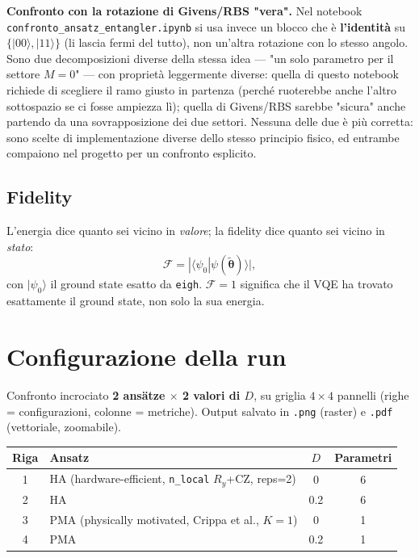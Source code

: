 \documentclass[11pt,a4paper]{article}
\begin{document}
\textbf{Confronto con la rotazione di Givens/RBS "vera".} Nel notebook
\texttt{confronto\_ansatz\_entangler.ipynb} si usa invece un blocco che
è \textbf{l'identità} su $\{|00\rangle,|11\rangle\}$ (li lascia fermi
del tutto), non un'altra rotazione con lo stesso angolo. Sono due
decomposizioni diverse della stessa idea --- "un solo parametro per il
settore $M=0$" --- con proprietà leggermente diverse: quella di questo
notebook richiede di scegliere il ramo giusto in partenza (perché
ruoterebbe anche l'altro sottospazio se ci fosse ampiezza lì); quella di
Givens/RBS sarebbe "sicura" anche partendo da una sovrapposizione dei
due settori. Nessuna delle due è più corretta: sono scelte di
implementazione diverse dello stesso principio fisico, ed entrambe
compaiono nel progetto per un confronto esplicito.

\subsection*{Fidelity}

L'energia dice quanto sei vicino in \emph{valore}; la fidelity dice
quanto sei vicino in \emph{stato}:
$$\mathcal F = |\langle\psi_0|\psi(\tilde{\boldsymbol\theta})\rangle|,$$
con $|\psi_0\rangle$ il ground state esatto da \texttt{eigh}.
$\mathcal F=1$ significa che il VQE ha trovato esattamente il ground
state, non solo la sua energia.

\section*{Configurazione della run}

Confronto incrociato \textbf{2 ansätze $\times$ 2 valori di $D$}, su
griglia $4\times4$ pannelli (righe = configurazioni, colonne =
metriche). Output salvato in \texttt{.png} (raster) e \texttt{.pdf}
(vettoriale, zoomabile).

\begin{center}
\renewcommand{\arraystretch}{1.25}
\begin{tabular}{@{}cp{5.3cm}cc@{}}
\toprule
\rowcolor{inkblue!10}
\textbf{Riga} & \textbf{Ansatz} & \textbf{$D$} & \textbf{Parametri}\\
\midrule
1 & HA (hardware-efficient, \texttt{n\_local} $R_y$+CZ, reps=2) & 0 & 6\\
2 & HA & 0.2 & 6\\
3 & PMA (physically motivated, Crippa et al., $K=1$) & 0 & 1\\
4 & PMA & 0.2 & 1\\
\bottomrule
\end{tabular}
\end{center}
\end{document}
